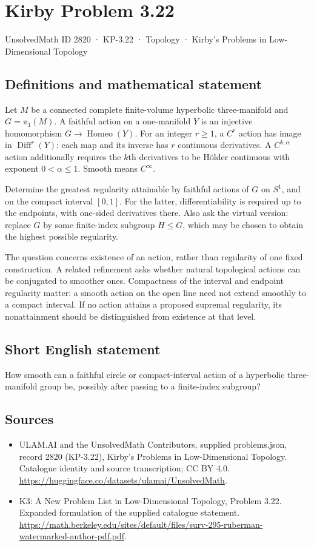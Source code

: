 \documentclass[11pt,a4paper]{article}
\begin{document}
\section*{Kirby Problem 3.22}\label{2820}
{\small UnsolvedMath ID 2820 · KP-3.22 · Topology · Kirby's Problems in Low-Dimensional Topology}
\subsection{Definitions and mathematical statement}
Let $M$ be a connected complete finite-volume hyperbolic three-manifold and
$G=\pi_1(M)$. A faithful action on a one-manifold $Y$ is an injective
homomorphism $G\to\operatorname{Homeo}(Y)$. For an integer $r\geq1$,
a $C^r$ action has image in $\operatorname{Diff}^r(Y)$: each map and its
inverse has $r$ continuous derivatives. A $C^{k,\alpha}$ action additionally
requires the $k$th derivatives to be Hölder continuous with exponent
$0<\alpha\leq1$. Smooth means $C^\infty$.

Determine the greatest regularity attainable by faithful actions of $G$ on
$S^1$, and on the compact interval $[0,1]$. For the latter, differentiability
is required up to the endpoints, with one-sided derivatives there. Also
ask the virtual version: replace $G$ by some finite-index subgroup $H\leq G$,
which may be chosen to obtain the highest possible regularity.

The question concerns existence of an action, rather than regularity of one
fixed construction. A related refinement asks whether natural topological
actions can be conjugated to smoother ones. Compactness of the interval and
endpoint regularity matter: a smooth action on the open line need not extend
smoothly to a compact interval. If no action attains a proposed supremal
regularity, its nonattainment should be distinguished from existence at that level.
\subsection{Short English statement}
How smooth can a faithful circle or compact-interval action of a hyperbolic three-manifold group be, possibly after passing to a finite-index subgroup?
\subsection{Sources}
\begin{itemize}
\item[S1] ULAM.AI and the UnsolvedMath Contributors, supplied problems.json, record 2820 (KP-3.22), Kirby's Problems in Low-Dimensional Topology. Catalogue identity and source transcription; CC BY 4.0.
\url{https://huggingface.co/datasets/ulamai/UnsolvedMath}.
\item[S2] K3: A New Problem List in Low-Dimensional Topology, Problem 3.22. Expanded formulation of the supplied catalogue statement.
\url{https://math.berkeley.edu/sites/default/files/surv-295-ruberman-watermarked-author-pdf.pdf}.
\end{itemize}
\end{document}
